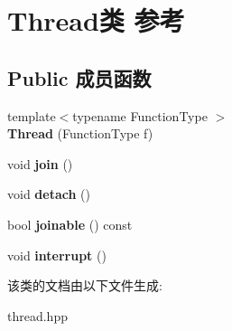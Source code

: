 \hypertarget{classThread}{}\section{Thread类 参考}
\label{classThread}
\subsection*{Public 成员函数}
\begin{DoxyCompactItemize}
\item 
\mbox{\label{classThread_aeb80f8682b8130910e650acae12326d6}} 
{\footnotesize template$<$typename Function\+Type $>$ }\\{\bfseries Thread} (Function\+Type f)
\item 
\mbox{\label{classThread_a4d9d788e98388a3217831a9046709deb}} 
void {\bfseries join} ()
\item 
\mbox{\label{classThread_a94278838e3bdd68971be803924e63bca}} 
void {\bfseries detach} ()
\item 
\mbox{\label{classThread_a9ec2dd465859670d1bd7e654890bc4b8}} 
bool {\bfseries joinable} () const
\item 
\mbox{\label{classThread_a1da77fcda48cbee7ae54bd47ecc7bcf5}} 
void {\bfseries interrupt} ()
\end{DoxyCompactItemize}


该类的文档由以下文件生成\+:\begin{DoxyCompactItemize}
\item 
thread.\+hpp\end{DoxyCompactItemize}
